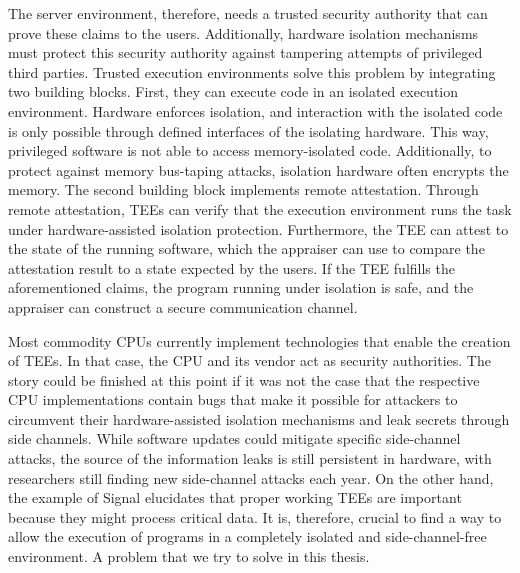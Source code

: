 The server environment, therefore, needs a trusted security authority that can prove these claims to the users.
Additionally, hardware isolation mechanisms must protect this security authority against tampering attempts of
privileged third parties. Trusted execution environments solve this
problem by integrating two building blocks. First, they can execute code in an isolated execution environment.
Hardware enforces isolation, and interaction with the isolated code is only possible through defined interfaces of
the isolating hardware. This way, privileged software is not able to access memory-isolated code. Additionally, to
protect against memory bus-taping attacks, isolation hardware often encrypts the memory. The second building block
implements remote attestation. Through remote attestation, TEEs can verify that the execution environment runs the task
under hardware-assisted isolation protection. Furthermore, the TEE can attest to the state of the running software, which
the appraiser can use to compare the attestation result to a state expected by the users. If the TEE fulfills the aforementioned
claims, the program running under isolation is safe, and the appraiser can construct a secure communication channel.

Most commodity CPUs currently implement technologies that enable the creation of TEEs. In that case, the CPU and its
vendor act as security authorities.\cite{tdx_whitepaper,kaplan_amd_2020,pinto_demystifying_2019,costan2016intel}
The story could be finished at this point if it was not the case that the respective CPU implementations contain bugs
that make it possible for attackers to circumvent their hardware-assisted isolation mechanisms and leak secrets through
side channels.\cite{kocher_spectre_2020,lipp_meltdown_2020,nilsson_survey_2020} While software updates could mitigate
specific side-channel attacks, the source of the information leaks is still persistent in hardware, with researchers
still finding new side-channel attacks each year.\cite{wikner2022retbleed,moghimi_downfall_2023,ragab_ghostrace_2024}
On the other hand, the example of Signal elucidates that proper working TEEs are important because they might process
critical data. It is, therefore, crucial to find a way to allow the execution of programs in a completely isolated and
side-channel-free environment. A problem that we try to solve in this thesis.
